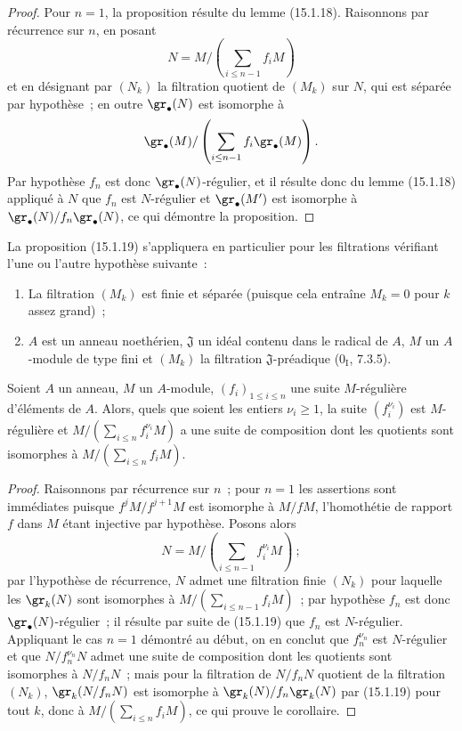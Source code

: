 \begin{proof}
Pour $n=1$, la proposition résulte du lemme (15.1.18). Raisonnons par
récurrence sur $n$, en posant
\[
  N=M/\left(\sum_{i\leq n-1}f_iM\right)
\]
et en désignant par $(N_k)$ la filtration quotient de $(M_k)$ sur $N$, qui
est séparée par hypothèse~; en outre $\gr_\bullet(N)$ est isomorphe à
\[
  \gr_\bullet(M)/
  \left(\sum_{i\leq n-1}f_i\gr_\bullet(M)\right).
\]
Par hypothèse $f_n$ est donc $\gr_\bullet(N)$-régulier, et il résulte donc du
lemme (15.1.18) appliqué à $N$ que $f_n$ est $N$-régulier et
$\gr_\bullet(M')$ est isomorphe à
$\gr_\bullet(N)/f_n\gr_\bullet(N)$, ce qui démontre la proposition.
\end{proof}

La proposition (15.1.19) s'appliquera en particulier pour les filtrations
vérifiant l'une ou l'autre hypothèse suivante~:
\begin{enumerate}
  \item[$1^\circ$] La filtration $(M_k)$ est finie et séparée (puisque cela
  entraîne $M_k=0$ pour $k$ assez grand)~;
  \item[$2^\circ$] $A$ est un anneau noethérien, $\mathfrak{J}$ un idéal
  contenu dans le radical de $A$, $M$ un $A$-module de type fini et $(M_k)$
  la filtration $\mathfrak{J}$-préadique ($0_{\mathrm I}$, 7.3.5).
\end{enumerate}

\begin{corollary}[15.1.20]
\label{0.15.1.20-fr}
Soient $A$ un anneau, $M$ un $A$-module, $(f_i)_{1\leq i\leq n}$ une suite
$M$-régulière d'éléments de $A$. Alors, quels que soient les entiers
$\nu_i\geq1$, la suite $(f_i^{\nu_i})$ est $M$-régulière et
$M/(\sum_{i\leq n}f_i^{\nu_i}M)$ a une suite de composition dont les
quotients sont isomorphes à $M/(\sum_{i\leq n}f_iM)$.
\end{corollary}

\begin{proof}
Raisonnons par récurrence sur $n$~; pour $n=1$ les assertions sont immédiates
puisque $f^jM/f^{j+1}M$ est isomorphe à $M/fM$, l'homothétie de rapport $f$
dans $M$ étant injective par hypothèse. Posons alors
\[
  N=M/\left(\sum_{i\leq n-1}f_i^{\nu_i}M\right)~;
\]
par l'hypothèse de récurrence, $N$ admet une filtration finie $(N_k)$ pour
laquelle les $\gr_k(N)$ sont isomorphes à
$M/(\sum_{i\leq n-1}f_iM)$~; par hypothèse $f_n$ est donc
$\gr_\bullet(N)$-régulier~; il résulte par suite de (15.1.19) que $f_n$ est
$N$-régulier. Appliquant le cas $n=1$ démontré au début, on en conclut que
$f_n^{\nu_n}$ est $N$-régulier et que $N/f_n^{\nu_n}N$ admet une suite de
composition dont les quotients sont isomorphes à $N/f_nN$~; mais pour la
filtration de $N/f_nN$ quotient de la filtration $(N_k)$,
$\gr_k(N/f_nN)$ est isomorphe à $\gr_k(N)/f_n\gr_k(N)$ par (15.1.19) pour
tout $k$, donc à $M/(\sum_{i\leq n}f_iM)$, ce qui prouve le corollaire.
\end{proof}

